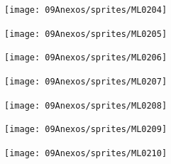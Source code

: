 \begin{center}
\texttt{[image: 09Anexos/sprites/ML0204]}
\end{center}

\begin{center}
\texttt{[image: 09Anexos/sprites/ML0205]}
\end{center}

\begin{center}
\texttt{[image: 09Anexos/sprites/ML0206]}
\end{center}

\begin{center}
\texttt{[image: 09Anexos/sprites/ML0207]}
\end{center}

\begin{center}
\texttt{[image: 09Anexos/sprites/ML0208]}
\end{center}

\begin{center}
\texttt{[image: 09Anexos/sprites/ML0209]}
\end{center}

\begin{center}
\texttt{[image: 09Anexos/sprites/ML0210]}
\end{center}